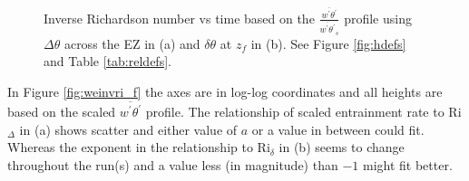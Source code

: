\begin{figure}[htbp]
\begin{minipage}[b]{0.5\linewidth}
         
        \\
        \end{minipage}             
\quad
\begin{minipage}[b]{0.5\linewidth}
        \\
       
       \end{minipage}
        \caption[Richardson Numbers based on $\frac{\overline{w^{'}\theta^{'}}}{\overline{w^{'}\theta^{'}}_{s}}$]{Inverse Richardson number vs time based on the $\frac{\overline{w^{'}\theta^{'}}}{\overline{w^{'}\theta^{'}}_{s}}$
profile using $\Delta \theta$ across the \acs{EZ} in (a) and $\delta \theta$ at $z_{f}$ in (b).  See Figure \ref{fig:hdefs} and Table \ref{tab:reldefs}.}
        \label{fig:invristime_f}
\end{figure}

In Figure \ref{fig:weinvri_f} the axes are in log-log coordinates and all heights are based on the scaled $\overline{w^{'}\theta^{'}}$ profile. The relationship of scaled entrainment rate to \acs{Ri}$_{\Delta}$ in (a) shows scatter and either value of $a$ or a value in between could fit.  Whereas the exponent in the relationship to \acs{Ri}$_{\delta}$ in (b) seems to change throughout the run(s) and a value less (in magnitude) than $-1$ might fit better. \\    

